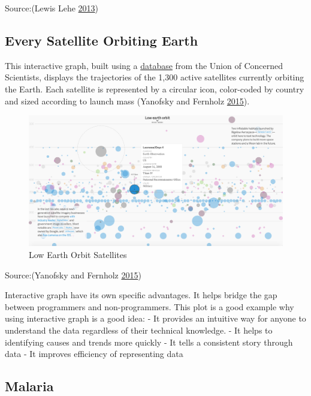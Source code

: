 \documentclass[]{book}
\begin{document}
Source:(Lewis Lehe \protect\hyperlink{ref-simpson_paradox}{2013})

\hypertarget{every-satellite-orbiting-earth}{%
\subsection{Every Satellite Orbiting Earth}\label{every-satellite-orbiting-earth}}

This interactive graph, built using a \href{https://www.ucsusa.org/nuclear-weapons/space-weapons/satellite-database\#.WxbaMVMvzq1}{database} from the Union of Concerned Scientists, displays the trajectories of the 1,300 active satellites currently orbiting the Earth. Each satellite is represented by a circular icon, color-coded by country and sized according to launch mass (Yanofsky and Fernholz \protect\hyperlink{ref-Satellite}{2015}).

\begin{figure}
\centering
\includegraphics{images/satellites.png}
\caption{Low Earth Orbit Satellites}
\end{figure}

Source:(Yanofsky and Fernholz \protect\hyperlink{ref-Satellite}{2015})

Interactive graph have its own specific advantages. It helps bridge the gap between programmers and non-programmers. This plot is a good example why using interactive graph is a good idea:
- It provides an intuitive way for anyone to understand the data regardless of their technical knowledge.
- It helps to identifying causes and trends more quickly
- It tells a consistent story through data
- It improves efficiency of representing data

\hypertarget{malaria}{%
\subsection{Malaria}\label{malaria}}
\end{document}
